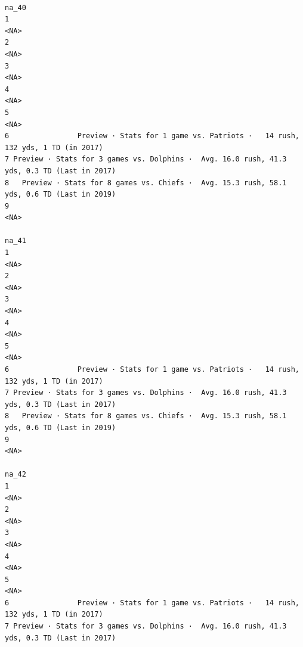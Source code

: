 \documentclass[
]{article}
\begin{document}
\begin{verbatim}
                                                                                        na_40
1                                                                                        <NA>
2                                                                                        <NA>
3                                                                                        <NA>
4                                                                                        <NA>
5                                                                                        <NA>
6                Preview · Stats for 1 game vs. Patriots ·   14 rush, 132 yds, 1 TD (in 2017)
7 Preview · Stats for 3 games vs. Dolphins ·  Avg. 16.0 rush, 41.3 yds, 0.3 TD (Last in 2017)
8   Preview · Stats for 8 games vs. Chiefs ·  Avg. 15.3 rush, 58.1 yds, 0.6 TD (Last in 2019)
9                                                                                        <NA>
                                                                                        na_41
1                                                                                        <NA>
2                                                                                        <NA>
3                                                                                        <NA>
4                                                                                        <NA>
5                                                                                        <NA>
6                Preview · Stats for 1 game vs. Patriots ·   14 rush, 132 yds, 1 TD (in 2017)
7 Preview · Stats for 3 games vs. Dolphins ·  Avg. 16.0 rush, 41.3 yds, 0.3 TD (Last in 2017)
8   Preview · Stats for 8 games vs. Chiefs ·  Avg. 15.3 rush, 58.1 yds, 0.6 TD (Last in 2019)
9                                                                                        <NA>
                                                                                        na_42
1                                                                                        <NA>
2                                                                                        <NA>
3                                                                                        <NA>
4                                                                                        <NA>
5                                                                                        <NA>
6                Preview · Stats for 1 game vs. Patriots ·   14 rush, 132 yds, 1 TD (in 2017)
7 Preview · Stats for 3 games vs. Dolphins ·  Avg. 16.0 rush, 41.3 yds, 0.3 TD (Last in 2017)

\end{verbatim}
\end{document}
